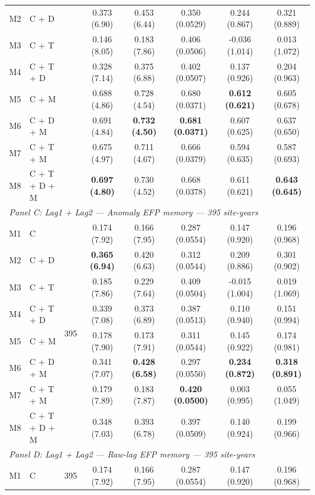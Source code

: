 \begin{table}[htbp]
\begin{tabular}{llcccccc}
M2 & C + D &  & 0.373 (6.90) & 0.453 (6.44) & 0.350 (0.0529) & 0.244 (0.867) & 0.321 (0.889) \\
M3 & C + T &  & 0.146 (8.05) & 0.183 (7.86) & 0.406 (0.0506) & -0.036 (1.014) & 0.013 (1.072) \\
M4 & C + T + D &  & 0.328 (7.14) & 0.375 (6.88) & 0.402 (0.0507) & 0.137 (0.926) & 0.204 (0.963) \\
M5 & C + M &  & 0.688 (4.86) & 0.728 (4.54) & 0.680 (0.0371) & \textbf{0.612 (0.621)} & 0.605 (0.678) \\
M6 & C + D + M &  & 0.691 (4.84) & \textbf{0.732 (4.50)} & \textbf{0.681 (0.0371)} & 0.607 (0.625) & 0.637 (0.650) \\
M7 & C + T + M &  & 0.675 (4.97) & 0.711 (4.67) & 0.666 (0.0379) & 0.594 (0.635) & 0.587 (0.693) \\
M8 & C + T + D + M &  & \textbf{0.697 (4.80)} & 0.730 (4.52) & 0.668 (0.0378) & 0.611 (0.621) & \textbf{0.643 (0.645)} \\
\midrule
\multicolumn{8}{l}{\textit{Panel C: Lag1 + Lag2 --- Anomaly EFP memory --- 395 site-years}} \\
\midrule
M1 & C & \multirow{8}{*}{395} & 0.174 (7.92) & 0.166 (7.95) & 0.287 (0.0554) & 0.147 (0.920) & 0.196 (0.968) \\
M2 & C + D &  & \textbf{0.365 (6.94)} & 0.420 (6.63) & 0.312 (0.0544) & 0.209 (0.886) & 0.301 (0.902) \\
M3 & C + T &  & 0.185 (7.86) & 0.229 (7.64) & 0.409 (0.0504) & -0.015 (1.004) & 0.019 (1.069) \\
M4 & C + T + D &  & 0.339 (7.08) & 0.373 (6.89) & 0.387 (0.0513) & 0.110 (0.940) & 0.151 (0.994) \\
M5 & C + M &  & 0.178 (7.90) & 0.173 (7.91) & 0.311 (0.0544) & 0.145 (0.922) & 0.174 (0.981) \\
M6 & C + D + M &  & 0.341 (7.07) & \textbf{0.428 (6.58)} & 0.297 (0.0550) & \textbf{0.234 (0.872)} & \textbf{0.318 (0.891)} \\
M7 & C + T + M &  & 0.179 (7.89) & 0.183 (7.87) & \textbf{0.420 (0.0500)} & 0.003 (0.995) & 0.055 (1.049) \\
M8 & C + T + D + M &  & 0.348 (7.03) & 0.393 (6.78) & 0.397 (0.0509) & 0.140 (0.924) & 0.199 (0.966) \\
\midrule
\multicolumn{8}{l}{\textit{Panel D: Lag1 + Lag2 --- Raw-lag EFP memory --- 395 site-years}} \\
\midrule
M1 & C & \multirow{8}{*}{395} & 0.174 (7.92) & 0.166 (7.95) & 0.287 (0.0554) & 0.147 (0.920) & 0.196 (0.968) \\

\end{tabular}
\end{table}
